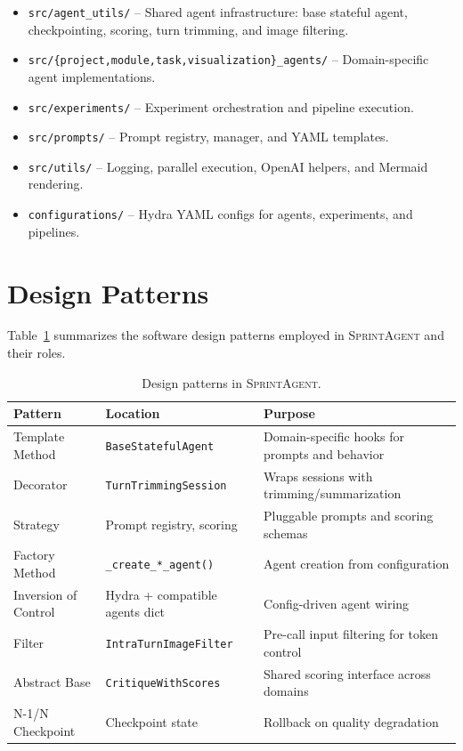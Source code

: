 \documentclass[11pt, a4paper]{article}
\newcommand{\sprintagent}{\textsc{SprintAgent}}
\newcommand{\ioc}{Inversion of Control}
\begin{document}
\begin{itemize}[leftmargin=*]
  \item \texttt{src/agent\_utils/} -- Shared agent infrastructure:
    base stateful agent, checkpointing, scoring, turn trimming, and
    image filtering.
  \item \texttt{src/\{project,module,task,visualization\}\_agents/} --
    Domain-specific agent implementations.
  \item \texttt{src/experiments/} -- Experiment orchestration and
    pipeline execution.
  \item \texttt{src/prompts/} -- Prompt registry, manager, and YAML
    templates.
  \item \texttt{src/utils/} -- Logging, parallel execution, OpenAI
    helpers, and Mermaid rendering.
  \item \texttt{configurations/} -- Hydra YAML configs for agents,
    experiments, and pipelines.
\end{itemize}

\section{Design Patterns}
\label{sec:patterns}

Table~\ref{tab:patterns} summarizes the software design patterns
employed in \sprintagent{} and their roles.

\begin{table}[H]
  \centering
  \caption{Design patterns in \sprintagent{}.}
  \label{tab:patterns}
  \begin{tabular}{@{}lll@{}}
    \toprule
    \textbf{Pattern} & \textbf{Location} & \textbf{Purpose} \\
    \midrule
    Template Method  & \texttt{BaseStatefulAgent}     & Domain-specific hooks for prompts and behavior \\
    Decorator        & \texttt{TurnTrimmingSession}   & Wraps sessions with trimming/summarization \\
    Strategy         & Prompt registry, scoring       & Pluggable prompts and scoring schemas \\
    Factory Method   & \texttt{\_create\_*\_agent()}   & Agent creation from configuration \\
    \ioc{}           & Hydra + compatible agents dict & Config-driven agent wiring \\
    Filter           & \texttt{IntraTurnImageFilter}  & Pre-call input filtering for token control \\
    Abstract Base    & \texttt{CritiqueWithScores}    & Shared scoring interface across domains \\
    N-1/N Checkpoint & Checkpoint state               & Rollback on quality degradation \\
    \bottomrule
  \end{tabular}
\end{table}
\end{document}
